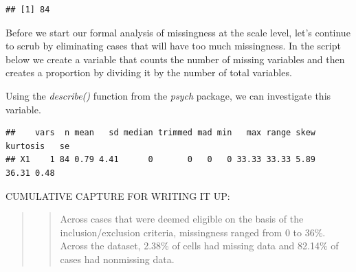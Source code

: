 \documentclass[
  11pt,
]{book}
\newenvironment{Shaded}{\begin{snugshade}}{\end{snugshade}}
\newcommand{\AttributeTok}[1]{\textcolor[rgb]{0.27,0.27,0.27}{#1}}
\newcommand{\CommentTok}[1]{\textcolor[rgb]{0.37,0.37,0.37}{\textit{#1}}}
\newcommand{\DecValTok}[1]{\textcolor[rgb]{0.06,0.06,0.06}{#1}}
\newcommand{\FunctionTok}[1]{\textcolor[rgb]{0.27,0.27,0.27}{\textbf{#1}}}
\newcommand{\NormalTok}[1]{#1}
\newcommand{\OtherTok}[1]{\textcolor[rgb]{0.37,0.37,0.37}{#1}}
\newcommand{\SpecialCharTok}[1]{\textcolor[rgb]{0.43,0.43,0.43}{\textbf{#1}}}
\begin{document}
\begin{verbatim}
## [1] 84
\end{verbatim}

Before we start our formal analysis of missingness at the scale level, let's continue to scrub by eliminating cases that will have too much missingness. In the script below we create a variable that counts the number of missing variables and then creates a proportion by dividing it by the number of total variables.

Using the \emph{describe()} function from the \emph{psych} package, we can investigate this variable.

\begin{Shaded}
\end{Shaded}

\begin{verbatim}
##    vars  n mean   sd median trimmed mad min   max range skew kurtosis   se
## X1    1 84 0.79 4.41      0       0   0   0 33.33 33.33 5.89    36.31 0.48
\end{verbatim}

CUMULATIVE CAPTURE FOR WRITING IT UP:

\begin{quote}
\begin{quote}
Across cases that were deemed eligible on the basis of the inclusion/exclusion criteria, missingness ranged from 0 to 36\%. Across the dataset, 2.38\% of cells had missing data and 82.14\% of cases had nonmissing data.
\end{quote}
\end{quote}
\end{document}
